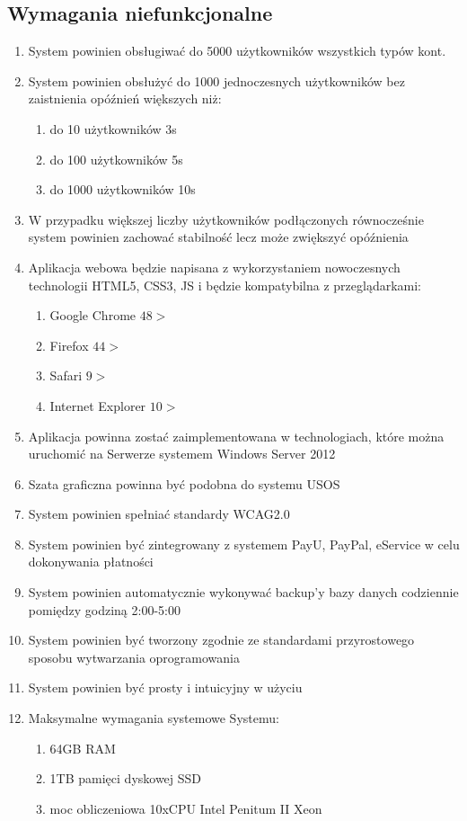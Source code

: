 \documentclass{article}
\begin{document}
\subsection{Wymagania niefunkcjonalne}
\begin{enumerate}
	\item System powinien obsługiwać do 5000 użytkowników wszystkich typów kont.
	\item System powinien obsłużyć do 1000 jednoczesnych użytkowników bez zaistnienia opóźnień większych niż:
	\begin{enumerate}
		\item 	do 10 użytkowników 3s
		\item do 100 użytkowników 5s
		\item do 1000 użytkowników 10s
	\end{enumerate}
	\item W przypadku większej liczby użytkowników podłączonych równocześnie system powinien zachować stabilność lecz może zwiększyć opóźnienia
	\item Aplikacja webowa będzie napisana z wykorzystaniem nowoczesnych technologii HTML5, CSS3, JS i będzie kompatybilna z przeglądarkami:
	\begin{enumerate}
		\item Google Chrome $48>$
		\item Firefox $44>$
		\item Safari $9>$
		\item Internet Explorer $10>$
	\end{enumerate}
	\item Aplikacja powinna zostać zaimplementowana w technologiach, które można uruchomić na Serwerze systemem Windows Server 2012
	\item Szata graficzna powinna być podobna do systemu USOS
	\item System powinien spełniać standardy WCAG2.0
	\item System powinien być zintegrowany z systemem PayU, PayPal, eService w celu dokonywania płatności
	\item System powinien automatycznie wykonywać backup’y bazy danych codziennie pomiędzy godziną 2:00-5:00
	\item System powinien być tworzony zgodnie ze standardami przyrostowego sposobu  wytwarzania oprogramowania
	\item System powinien być prosty i intuicyjny w użyciu
	\item Maksymalne wymagania systemowe Systemu:
	\begin{enumerate}
		\item 64GB RAM
		\item 1TB pamięci dyskowej SSD
		\item moc obliczeniowa 10xCPU Intel Penitum II Xeon
	\end{enumerate}


\end{enumerate}
\end{document}
